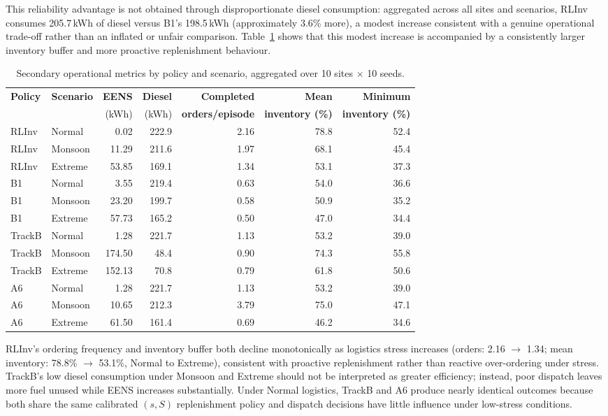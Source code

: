 This reliability advantage is not obtained through disproportionate
diesel consumption: aggregated across all sites and scenarios, RLInv
consumes 205.7\,kWh of diesel versus B1's 198.5\,kWh (approximately
3.6\% more), a modest increase consistent with a genuine operational
trade-off rather than an inflated or unfair comparison.
Table~\ref{tab:secondary_metrics} shows that this modest increase is
accompanied by a consistently larger inventory buffer and more proactive
replenishment behaviour.

\begin{table}[htb]
\centering
\small
\caption{Secondary operational metrics by policy and scenario, aggregated
over 10 sites $\times$ 10 seeds.}
\label{tab:secondary_metrics}
\begin{tabular}{llrrrrr}
\toprule
\textbf{Policy} & \textbf{Scenario} & \textbf{EENS} & \textbf{Diesel} &
\textbf{Completed} & \textbf{Mean} & \textbf{Minimum} \\
 & & (kWh) & (kWh) & \textbf{orders/episode} & \textbf{inventory (\%)} & \textbf{inventory (\%)} \\
\midrule
RLInv  & Normal  & 0.02   & 222.9 & 2.16 & 78.8 & 52.4 \\
RLInv  & Monsoon & 11.29  & 211.6 & 1.97 & 68.1 & 45.4 \\
RLInv  & Extreme & 53.85  & 169.1 & 1.34 & 53.1 & 37.3 \\
\midrule
B1     & Normal  & 3.55   & 219.4 & 0.63 & 54.0 & 36.6 \\
B1     & Monsoon & 23.20  & 199.7 & 0.58 & 50.9 & 35.2 \\
B1     & Extreme & 57.73  & 165.2 & 0.50 & 47.0 & 34.4 \\
\midrule
TrackB & Normal  & 1.28   & 221.7 & 1.13 & 53.2 & 39.0 \\
TrackB & Monsoon & 174.50 & 48.4  & 0.90 & 74.3 & 55.8 \\
TrackB & Extreme & 152.13 & 70.8  & 0.79 & 61.8 & 50.6 \\
\midrule
A6     & Normal  & 1.28   & 221.7 & 1.13 & 53.2 & 39.0 \\
A6     & Monsoon & 10.65  & 212.3 & 3.79 & 75.0 & 47.1 \\
A6     & Extreme & 61.50  & 161.4 & 0.69 & 46.2 & 34.6 \\
\bottomrule
\end{tabular}
\end{table}

RLInv's ordering frequency and inventory buffer both decline
monotonically as logistics stress increases (orders: 2.16 $\to$ 1.34;
mean inventory: 78.8\% $\to$ 53.1\%, Normal to Extreme), consistent with
proactive replenishment rather than reactive over-ordering under stress.
TrackB's low diesel consumption under Monsoon and Extreme should not be
interpreted as greater efficiency; instead, poor dispatch leaves more
fuel unused while EENS increases substantially. Under Normal logistics,
TrackB and A6 produce nearly identical outcomes because both share the
same calibrated $(s,S)$ replenishment policy and dispatch decisions have
little influence under low-stress conditions.

